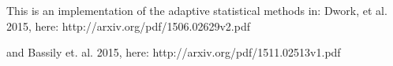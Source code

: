 This is an implementation of the adaptive statistical methods in:
 Dwork, et al. 2015, here: http://arxiv.org/pdf/1506.02629v2.pdf

and Bassily et. al. 2015, here: http://arxiv.org/pdf/1511.02513v1.pdf


